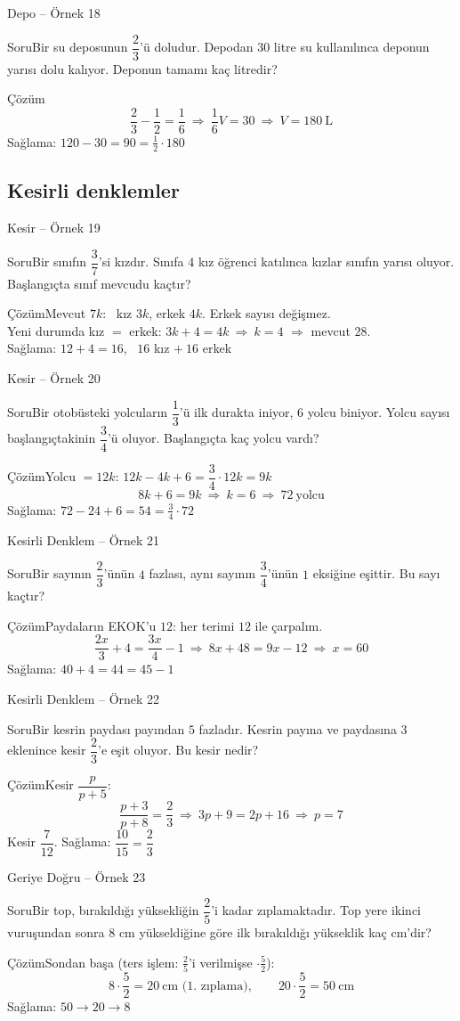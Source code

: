 \documentclass[aspectratio=169,11pt,handout]{beamer}
\newcommand{\soru}[3]{%
\begin{frame}{#1}
  \begin{block}{Soru}\large #2\end{block}
  \pause
  \begin{exampleblock}{Çözüm}\large #3\end{exampleblock}
\end{frame}}
\begin{document}
\soru{Depo -- Örnek 18}
{Bir su deposunun \(\dfrac{2}{3}\)'ü doludur. Depodan \(30\) litre su kullanılınca deponun yarısı dolu kalıyor. Deponun tamamı kaç litredir?}
{\[\frac{2}{3}-\frac{1}{2}=\frac{1}{6}\ \Rightarrow\ \frac{1}{6}V=30\ \Rightarrow\ V=180\ \text{L}\]
Sağlama: \(120-30=90=\frac{1}{2}\cdot 180\) \checkmark}

\subsection{Kesirli denklemler}
\soru{Kesir -- Örnek 19}
{Bir sınıfın \(\dfrac{3}{7}\)'si kızdır. Sınıfa \(4\) kız öğrenci katılınca kızlar sınıfın yarısı oluyor. Başlangıçta sınıf mevcudu kaçtır?}
{Mevcut \(7k\): \ kız \(3k\), erkek \(4k\). Erkek sayısı değişmez.\\[2pt]
Yeni durumda kız \(=\) erkek: \quad \(3k+4=4k\ \Rightarrow\ k=4\) \(\Rightarrow\) mevcut \(28\).\\[3pt]
Sağlama: \(12+4=16\), \ \(16\) kız \(+\ 16\) erkek \checkmark}

\soru{Kesir -- Örnek 20}
{Bir otobüsteki yolcuların \(\dfrac{1}{3}\)'ü ilk durakta iniyor, \(6\) yolcu biniyor. Yolcu sayısı başlangıçtakinin \(\dfrac{3}{4}\)'ü oluyor. Başlangıçta kaç yolcu vardı?}
{Yolcu \(=12k\): \quad \(12k-4k+6=\dfrac{3}{4}\cdot 12k=9k\)
\[8k+6=9k\ \Rightarrow\ k=6\ \Rightarrow\ 72\ \text{yolcu}\]
Sağlama: \(72-24+6=54=\frac{3}{4}\cdot 72\) \checkmark}

\soru{Kesirli Denklem -- Örnek 21}
{Bir sayının \(\dfrac{2}{3}\)'ünün \(4\) fazlası, aynı sayının \(\dfrac{3}{4}\)'ünün \(1\) eksiğine eşittir. Bu sayı kaçtır?}
{Paydaların EKOK'u \(12\): her terimi \(12\) ile çarpalım.
\[\frac{2x}{3}+4=\frac{3x}{4}-1\ \Rightarrow\ 8x+48=9x-12\ \Rightarrow\ x=60\]
Sağlama: \(40+4=44=45-1\) \checkmark}

\soru{Kesirli Denklem -- Örnek 22}
{Bir kesrin paydası payından \(5\) fazladır. Kesrin payına ve paydasına \(3\) eklenince kesir \(\dfrac{2}{3}\)'e eşit oluyor. Bu kesir nedir?}
{Kesir \(\dfrac{p}{p+5}\):
\[\frac{p+3}{p+8}=\frac{2}{3}\ \Rightarrow\ 3p+9=2p+16\ \Rightarrow\ p=7\]
Kesir \(\dfrac{7}{12}\). \quad Sağlama: \(\dfrac{10}{15}=\dfrac{2}{3}\) \checkmark}

\soru{Geriye Doğru -- Örnek 23}
{Bir top, bırakıldığı yüksekliğin \(\dfrac{2}{5}\)'i kadar zıplamaktadır. Top yere ikinci vuruşundan sonra \(8\) cm yükseldiğine göre ilk bırakıldığı yükseklik kaç cm'dir?}
{Sondan başa (ters işlem: \(\frac{2}{5}\)'i verilmişse \(\cdot\frac{5}{2}\)):
\[8\cdot\frac{5}{2}=20\ \text{cm (1. zıplama)},\qquad 20\cdot\frac{5}{2}=50\ \text{cm}\]
Sağlama: \(50\to 20\to 8\) \checkmark}
\end{document}
